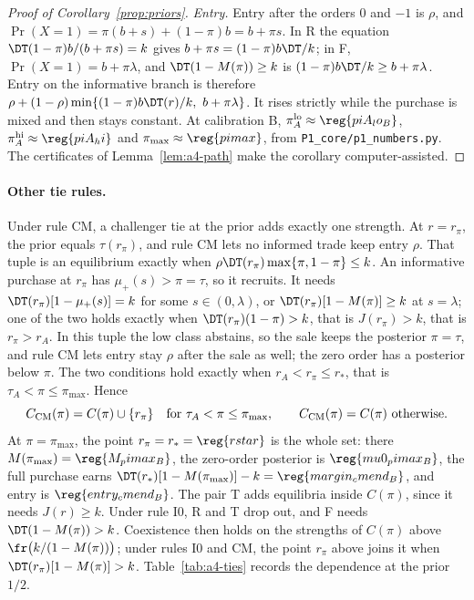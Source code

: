 \begin{proof}[Proof of Corollary~\ref{prop:priors}]
\emph{Entry.} Entry after the orders \(0\) and \(-1\) is \(\rho\), and \(\Pr(X=1)=\pi(b+s)+(1-\pi)b=b+\pi s\). In R the
equation \(\DT(1-\pi)b/(b+\pi s)=k\) gives \(b+\pi s=(1-\pi)b\DT/k\); in F, \(\Pr(X=1)=b+\pi\lambda\), and
\(\DT(1-M(\pi))\ge k\) is \((1-\pi)b\DT/k\ge b+\pi\lambda\). Entry on the informative branch is therefore
\(\rho+(1-\rho)\min\{(1-\pi)b\DT(r)/k,\ b+\pi\lambda\}\). It rises strictly while the purchase is mixed and then
stays constant. At calibration B, \(\pi_A^{\rm lo}\approx\reg{piA_lo_B}\), \(\pi_A^{\rm hi}\approx\reg{piA_hi}\) and
\(\pi_{\max}\approx\reg{pimax}\), from \nolinkurl{P1_core/p1_numbers.py}.
The certificates of Lemma~\ref{lem:a4-path} make the corollary computer-assisted.
\end{proof}

\paragraph{Other tie rules.}
Under rule CM, a challenger tie at the prior adds exactly one strength. At \(r=r_\pi\), the prior equals
\(\tau(r_\pi)\), and rule CM lets no informed trade keep entry \(\rho\). That tuple is an equilibrium exactly when
\(\rho\DT(r_\pi)\max\{\pi,1-\pi\}\le k\). An informative purchase at \(r_\pi\) has \(\mu_+(s)>\pi=\tau\), so it
recruits. It needs \(\DT(r_\pi)[1-\mu_+(s)]=k\) for some \(s\in(0,\lambda)\), or \(\DT(r_\pi)[1-M(\pi)]\ge k\) at
\(s=\lambda\); one of the two holds exactly when \(\DT(r_\pi)(1-\pi)>k\), that is \(J(r_\pi)>k\), that is
\(r_\pi>r_A\). In this tuple the low class abstains, so the sale keeps the posterior \(\pi=\tau\), and rule CM lets
entry stay \(\rho\) after the sale as well; the zero order has a posterior below \(\pi\). The two conditions hold exactly when \(r_A<r_\pi\le r_*\), that is
\(\tau_A<\pi\le\pi_{\max}\). Hence
\[
C_{\rm CM}(\pi)=C(\pi)\cup\{r_\pi\}\quad\text{for }\tau_A<\pi\le\pi_{\max},\qquad C_{\rm CM}(\pi)=C(\pi)\ \text{otherwise}.
\]
At \(\pi=\pi_{\max}\), the point \(r_\pi=r_*=\reg{rstar}\) is the whole set: there \(M(\pi_{\max})=\reg{M_pimax_B}\), the
zero-order posterior is \(\reg{mu0_pimax_B}\), the full purchase earns \(\DT(r_*)[1-M(\pi_{\max})]-k=\reg{margin_cmend_B}\),
and entry is \(\reg{entry_cmend_B}\). The pair T adds equilibria inside \(C(\pi)\), since it
needs \(J(r)\ge k\). Under rule I0, R and T drop out, and F needs \(\DT(1-M(\pi))>k\). Coexistence then holds on
the strengths of \(C(\pi)\) above \(\fr\bigl(k/(1-M(\pi))\bigr)\); under rules I0 and CM, the point \(r_\pi\) above
joins it when \(\DT(r_\pi)[1-M(\pi)]>k\). Table~\ref{tab:a4-ties} records the dependence at the prior \(1/2\).


